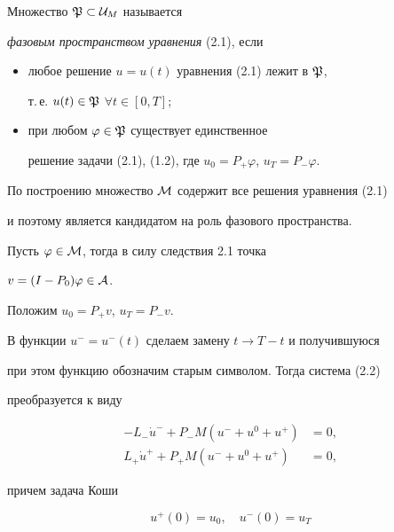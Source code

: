 \begin{defns}


Множество ${\frak P}\subset{\cal U}_M$ называется


{\it фазовым пространством уравнения} (2.1), если


\begin{itemize}


\item[(i)] любое решение $u = u(t)$ уравнения (2.1) лежит в ${\frak P}$,


т.\,е. $u(t)\in{\frak P}$\; $\forall t\in [0, T]$;


\item[(ii)] при любом $\varphi\in{\frak P}$ существует единственное


решение задачи (2.1), (1.2), где $u_0 = P_+\varphi$, $u_T=P_-\varphi$.


\end{itemize}


\end{defns}





По построению множество ${\cal M}$ содержит все решения уравнения (2.1)


и поэтому является кандидатом на роль фазового пространства.


Пусть $\varphi\in{\cal M}$, тогда в силу следствия 2.1 точка


$v = (I - P_0)\varphi\in{\cal A}$.


Положим $u_0 = P_+v$, $u_T = P_-v$.


В функции $u^- = u^-(t)$ сделаем замену $t\to T-t$ и получившуюся


при этом функцию обозначим старым символом. Тогда система (2.2)


преобразуется к виду


\begin{equation}


\begin{split}


-L_-\Dot{u}^-+ P_- M (u^- + u^0 + u^+) &= 0,\\


L_+\Dot{u}^+ + P_+ M (u^- + u^0 + u^+) &= 0,


\end{split}


\end{equation}


причем задача Коши


\begin{equation}


u^+(0)= u_0,\quad u^-(0)= u_T


\end{equation}


